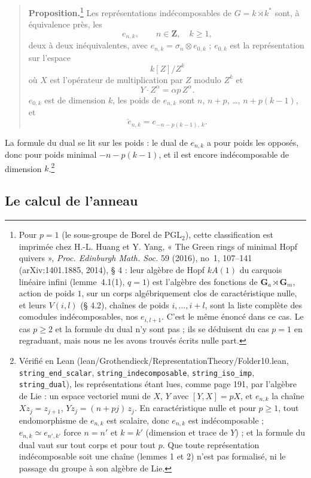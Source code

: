 \documentclass[11pt,a4paper]{article}
\begin{document}
\begin{quote}
\textbf{Proposition.}\footnote{Pour $p = 1$ (le sous-groupe de Borel de
$\mathrm{PGL}_{2}$), cette classification est imprimée chez H.-L. Huang et
Y. Yang, « The Green rings of minimal Hopf quivers », \emph{Proc. Edinburgh
Math. Soc.} 59 (2016), no~1, 107--141 (arXiv:1401.1885, 2014), § 4 : leur
algèbre de Hopf $kA(1)$ du carquois linéaire infini (lemme~4.1(1), $q = 1$)
est l'algèbre des fonctions de $\mathbf{G}_{a} \rtimes \mathbf{G}_{m}$, action
de poids $1$, sur un corps algébriquement clos de caractéristique nulle, et
leurs $V(i, l)$ (§ 4.2), chaînes de poids $i, \ldots, i + l$, sont la liste
complète des comodules indécomposables, nos $e_{i,l+1}$. C'est le même énoncé
dans ce cas. Le cas $p \geqslant 2$ et la formule du dual n'y sont pas ; ils
se déduisent du cas $p = 1$ en regraduant, mais nous ne les avons trouvés
écrits nulle part.} Les représentations indécomposables de $G = k \rtimes
k^{*}$ sont, à équivalence près, les
\[
e_{n,k} , \qquad n \in \mathbf{Z} , \quad k \geqslant 1 ,
\]
deux à deux inéquivalentes, avec $e_{n,k} = \sigma_{n} \otimes e_{0,k}$ ;
$e_{0,k}$ est la représentation sur l'espace
\[
k[Z]/Z^{k}
\]
où $X$ est l'opérateur de multiplication par $Z$ modulo $Z^{k}$ et
\[
Y \cdot Z^{\alpha} = \alpha p\,Z^{\alpha} .
\]
$e_{0,k}$ est de dimension $k$, les poids de $e_{n,k}$ sont $n$, $n+p$,
\ldots, $n + p(k-1)$, et
\[
\check{e}_{n,k} = e_{-n-p(k-1),\,k} .
\]
\end{quote}
La formule du dual se lit sur les poids : le dual de $e_{n,k}$ a pour poids les
opposés, donc pour poids minimal $-n-p(k-1)$, et il est encore indécomposable
de dimension $k$.\footnote{Vérifié en Lean (lean/Grothendieck/RepresentationTheory/Folder10.lean,
\texttt{string\_end\_scalar}, \texttt{string\_indecomposable},
\texttt{string\_iso\_imp}, \texttt{string\_dual}), les représentations étant
lues, comme page 191, par l'algèbre de Lie : un espace vectoriel muni de $X$,
$Y$ avec $[Y, X] = pX$, et $e_{n,k}$ la chaîne $X z_j = z_{j+1}$, $Y z_j = (n
+ pj)\, z_j$. En caractéristique nulle et pour $p \geqslant 1$, tout
endomorphisme de $e_{n,k}$ est scalaire, donc $e_{n,k}$ est indécomposable ;
$e_{n,k} \simeq e_{n',k'}$ force $n = n'$ et $k = k'$ (dimension et trace de
$Y$) ; et la formule du dual vaut sur tout corps et pour tout $p$. Que toute
représentation indécomposable soit une chaîne (lemmes 1 et 2) n'est pas
formalisé, ni le passage du groupe à son algèbre de Lie.}

\subsection*{Le calcul de l'anneau}
\end{document}
